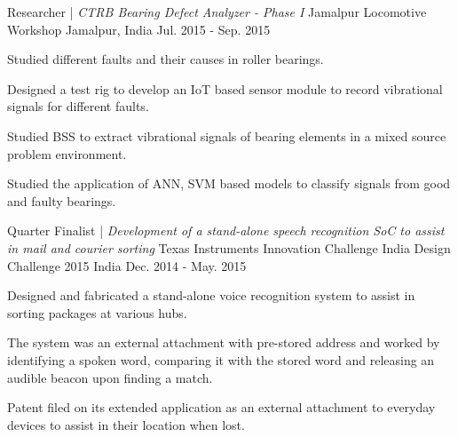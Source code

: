 \begin{cventries}
\cventry
  	{Researcher | \textit{CTRB Bearing Defect Analyzer - Phase I}}
  	{Jamalpur Locomotive Workshop}
  	{Jamalpur, India}
  	{Jul. 2015 - Sep. 2015}
  	{ \begin{cvitems}
  		\item {Studied different faults and their causes in roller bearings.}
  		\item {Designed a test rig to develop an IoT based sensor module to record vibrational signals for different faults.}
  		\item {Studied BSS to extract vibrational signals of bearing elements in a mixed source problem environment.}
  		\item {Studied the application of ANN, SVM based models to classify signals from good and faulty bearings.}
  	  \end{cvitems}
  	}
\cventry
    {Quarter Finalist | \textit{Development of a stand-alone speech recognition SoC to assist in mail and courier sorting}}
    {Texas Instruments Innovation Challenge India Design Challenge 2015}
    {India}
    {Dec. 2014 - May. 2015}
    {
      \begin{cvitems}
        \item {Designed and fabricated a stand-alone voice recognition system to assist in sorting packages at various hubs.}
        \item {The system was an external attachment with pre-stored address and worked by identifying a spoken word, comparing it with the stored word and releasing an audible beacon upon finding a match. \href{https://www.youtube.com/watch?v=rx7Vyt9G-do}{}}
        \item {Patent filed on its extended application as an external attachment to everyday devices to assist in their location when lost.}
      \end{cvitems} 
    }
\end{cventries}